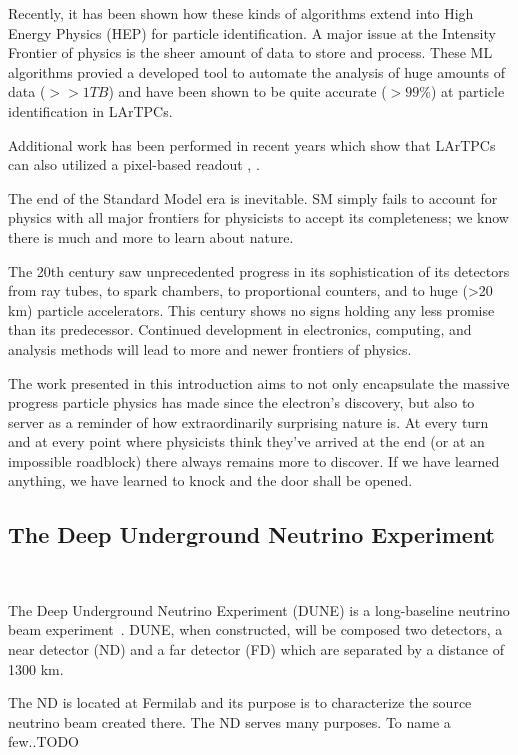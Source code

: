 Recently, it has been shown how these kinds of algorithms extend into High Energy Physics (HEP) for particle identification.
A major issue at the Intensity Frontier of physics is the sheer amount of data to store and process.
These ML algorithms provied a developed tool to automate the analysis of huge amounts of data ($>> 1 TB$) and have been shown to be quite accurate ($>99\%$) at particle identification in LArTPCs.


Additional work has been performed in recent years which show that LArTPCs can also utilized a pixel-based readout \citep{larpix:Dwyer_2018}, \citep{Asaadi_2018}.

The end of the Standard Model era is inevitable.
SM simply fails to account for physics with all major frontiers for physicists to accept its completeness; we know there is much and more to learn about nature.

The 20th century saw unprecedented progress in its sophistication of its detectors from ray tubes, to spark chambers, to proportional counters, and to huge (>20 km) particle accelerators.
This century shows no signs holding any less promise than its predecessor.
Continued development in electronics, computing, and analysis methods will lead to more and newer frontiers of physics.

The work presented in this introduction aims to not only encapsulate the massive progress particle physics has made since the electron's discovery, but also to server as a reminder of how extraordinarily surprising nature is.
At every turn and at every point where physicists think they've arrived at the end (or at an impossible roadblock) there always remains more to discover.
If we have learned anything, we have learned to knock and the door shall be opened.


\subsection{The Deep Underground Neutrino Experiment}~\label{sec:dune}

The Deep Underground Neutrino Experiment (DUNE) is a long-baseline neutrino beam experiment~\citep{DUNE_TDR_V1_Abi_2020, DUNE_FD_TDRv2_2020, DUNE_TDRv3_Abi_2020, DUNE-FD_TDRv4:Abi_2020}.
DUNE, when constructed, will be composed two detectors, a near detector (ND) and a far detector (FD) which are separated by a distance of 1300 km.

The ND is located at Fermilab and its purpose is to characterize the source neutrino beam created there.
The ND serves many purposes.
To name a few..TODO

